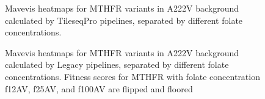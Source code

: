 \documentclass{article}
\begin{document}
\begin{figure}[H]%
    \centering
    \qquad
    \qquad
    \qquad
    \caption{Mavevis heatmaps for MTHFR variants in A222V background calculated by TileseqPro pipelines, separated by different folate concentrations.}%
    \label{fig:new MTHFR map}%
\end{figure}

\begin{figure}[H]%
    \centering
    \qquad
    \qquad
    \qquad
    \caption{Mavevis heatmaps for MTHFR variants in A222V background calculated by Legacy pipelines, separated by different folate concentrations. Fitness scores for MTHFR with folate concentration f12AV, f25AV, and f100AV are flipped and floored}%
    \label{fig:old MTHFR map}%
\end{figure}
\end{document}
